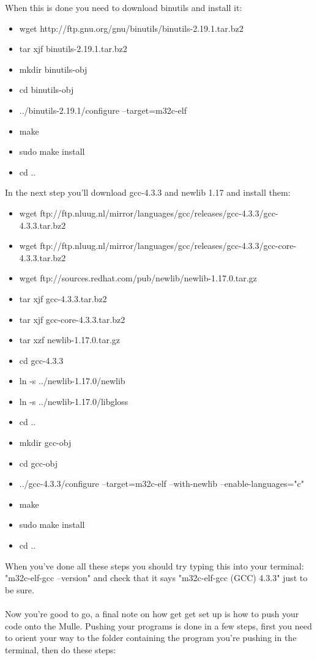 \noindent When this is done you need to download binutils and install it:
\begin{itemize}
\item wget http://ftp.gnu.org/gnu/binutils/binutils-2.19.1.tar.bz2
\item tar xjf binutils-2.19.1.tar.bz2
\item mkdir binutils-obj
\item cd binutils-obj
\item ../binutils-2.19.1/configure --target=m32c-elf
\item make
\item sudo make install
\item cd ..
\end{itemize}

\noindent In the next step you'll download gcc-4.3.3 and newlib 1.17 and install them:
\begin{itemize}
\item wget ftp://ftp.nluug.nl/mirror/languages/gcc/releases/gcc-4.3.3/gcc-4.3.3.tar.bz2
\item wget ftp://ftp.nluug.nl/mirror/languages/gcc/releases/gcc-4.3.3/gcc-core-4.3.3.tar.bz2
\item wget ftp://sources.redhat.com/pub/newlib/newlib-1.17.0.tar.gz
\item tar xjf gcc-4.3.3.tar.bz2
\item tar xjf gcc-core-4.3.3.tar.bz2
\item tar xzf newlib-1.17.0.tar.gz
\item cd gcc-4.3.3
\item ln -s ../newlib-1.17.0/newlib
\item ln -s ../newlib-1.17.0/libgloss
\item cd ..
\item mkdir gcc-obj
\item cd gcc-obj
\item ../gcc-4.3.3/configure --target=m32c-elf --with-newlib --enable-languages="c"
\item make
\item sudo make install
\item cd ..
\end{itemize}
When you've done all these steps you should try typing this into your terminal: "m32c-elf-gcc --version" and check that it says "m32c-elf-gcc (GCC) 4.3.3" just to be sure.
\\\\
Now you're good to go, a final note on how get get set up is how to push your code onto the Mulle. Pushing your programs is done in a few steps, first you need to orient your way to the folder containing the program you're pushing in the terminal, then do these steps:
